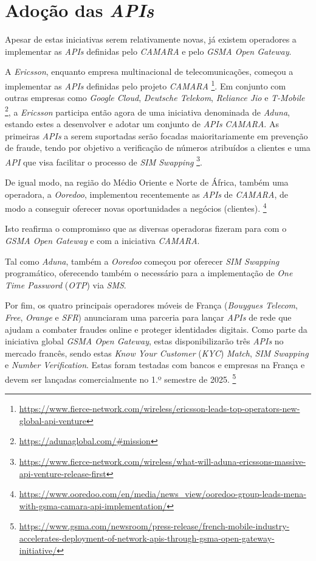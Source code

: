 \section{Adoção das \emph{APIs}}

Apesar de estas iniciativas serem relativamente novas, já existem operadores a
implementar as \emph{APIs} definidas pelo \emph{CAMARA} e pelo \emph{GSMA Open
	Gateway}.

A \emph{Ericsson}, enquanto empresa multinacional de telecomunicações, começou
a implementar as \emph{APIs} definidas pelo projeto \emph{CAMARA}
\footnote{\url{https://www.fierce-network.com/wireless/ericsson-leads-top-operators-new-global-api-venture}}.
Em conjunto com outras empresas como \emph{Google Cloud}, \emph{Deutsche
	Telekom}, \emph{Reliance Jio} e \emph{T-Mobile}
\footnote{\url{https://adunaglobal.com/\#mission}}, a \emph{Ericsson} participa
então agora de uma iniciativa denominada de \emph{Aduna}, estando estes a
desenvolver e adotar um conjunto de \emph{APIs} \emph{CAMARA}. As primeiras
\emph{APIs} a serem suportadas serão focadas maioritariamente em prevenção de
fraude, tendo por objetivo a verificação de números atribuídos a clientes e uma
\emph{API} que visa facilitar o processo de \emph{SIM Swapping}
\footnote{\url{https://www.fierce-network.com/wireless/what-will-aduna-ericssons-massive-api-venture-release-first}}.

De igual modo, na região do Médio Oriente e Norte de África, também uma
operadora, a \emph{Ooredoo}, implementou recentemente as \emph{APIs} de
\emph{CAMARA}, de modo a conseguir oferecer novas oportunidades a negócios
(clientes).
\footnote{\url{https://www.ooredoo.com/en/media/news_view/ooredoo-group-leads-mena-with-gsma-camara-api-implementation/}}

Isto reafirma o compromisso que as diversas operadoras fizeram para com o
\emph{GSMA Open Gateway} e com a iniciativa \emph{CAMARA}.

Tal como \emph{Aduna}, também a \emph{Ooredoo} começou por oferecer \emph{SIM
	Swapping} programático, oferecendo também o necessário para a implementação de
\emph{One Time Password} (\emph{OTP}) via \emph{SMS}.

Por fim, os quatro principais operadores móveis de França (\emph{Bouygues
	Telecom}, \emph{Free}, \emph{Orange} e \emph{SFR}) anunciaram uma parceria para
lançar \emph{APIs} de rede que ajudam a combater fraudes online e proteger
identidades digitais. Como parte da iniciativa global \emph{GSMA Open Gateway},
estas disponibilizarão três \emph{APIs} no mercado francês, sendo estas
\emph{Know Your Customer} (\emph{KYC}) \emph{Match}, \emph{SIM Swapping} e
\emph{Number Verification}. Estas foram testadas com bancos e empresas na
França e devem ser lançadas comercialmente no 1.º semestre de 2025.
\footnote{\url{https://www.gsma.com/newsroom/press-release/french-mobile-industry-accelerates-deployment-of-network-apis-through-gsma-open-gateway-initiative/}}
